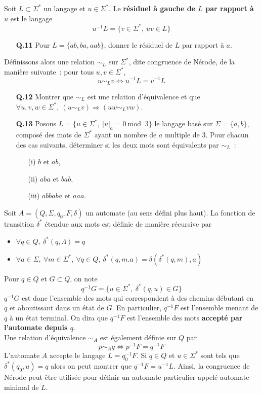 \documentclass[11pt,a4paper]{article}\nofiles
\begin{document}
Soit $L\subset \Sigma^*$ un langage et $u\in \Sigma^*$. Le \textbf{r\'esiduel \`a gauche de $L$ par rapport \`a $u$} est le langage
\[u^{-1}L=\{v\in \Sigma^*,\ uv\in L\}\]
\begin{enumerate}
\item[{\bf Q.11}] Pour $L=\{ab,ba,aab\}$, donner le r\'esiduel de $L$ par rapport \`a $a$.
\end{enumerate}
D\'efinissons alors une relation $\sim_L$ sur $\Sigma^*$, dite congruence de N\'erode, de la mani\`ere suivante~: pour tous $u,v\in \Sigma^*$,
\[u\sim_L v\iff u^{-1}L=v^{-1}L\]
\begin{enumerate}
\item[{\bf Q.12}] Montrer que $\sim_L$ est une relation d'\'equivalence et que $\forall u,v,w\in \Sigma^*,\ (u\sim_Lv)\Rightarrow (uw\sim_L vw)$.
\item[{\bf Q.13}] Posons $L=\{u\in \Sigma^*,\ |u|_a=0\ \textrm{mod }\ 3\}$ le langage bas\'e sur $\Sigma=\{a,b\}$, compos\'e des mots de $\Sigma^*$ ayant un nombre de $a$ multiple de $3$. Pour chacun des cas suivants, d\'eterminer si les deux mots sont \'equivalents par $\sim_L$~:
\begin{enumerate}
\item[(i)] $b$ et $ab$,
\item[(ii)] $aba$ et $bab$,
\item[(iii)] $abbaba$ et $aaa$.
\end{enumerate}
\end{enumerate}
Soit $A=(Q,\Sigma,q_0,F,\delta)$ un automate (au sens d\'efini plus haut). La fonction de transition $\delta^*$ \'etendue aux mots est d\'efinie de mani\`ere r\'ecursive par
\begin{itemize}
\item $\forall q\in Q,\ \delta^*(q,\Lambda)=q$
\item $\forall a\in \Sigma,\ \forall m\in \Sigma^*,\ \forall q\in Q,\ \delta^*(q,m.a)=\delta(\delta^*(q,m),a)$
\end{itemize}
Pour $q\in Q$ et $G\subset Q$, on note
\[q^{-1}G=\{u\in \Sigma^*,\ \delta^*(q,u)\in G\}\]
$q^{-1}G$ est donc l'ensemble des mots qui correspondent \`a des chemins d\'ebutant en $q$ et aboutissant dans un \'etat de $G$. En particulier, $q^{-1}F$ est l'ensemble menant de $q$ \`a un \'etat terminal. On dira que $q^{-1}F$ est l'ensemble des mots \textbf{accept\'e par l'automate depuis $q$}.\\

Une relation d'\'equivalence $\sim_A$ est \'egalement d\'efinie sur $Q$ par
\[p\sim_A q\iff p^{-1}F=q^{-1}F\]
L'automate $A$ accepte le langage $L=q_0^{-1}F$. Si $q\in Q$ et $u\in \Sigma^*$ sont tels que $\delta^*(q_0,u)=q$ alors on peut montrer que $q^{-1}F=u^{-1}L$. 
Ainsi, la congruence de N\'erode peut \^etre utilis\'ee pour d\'efinir un automate particulier appel\'e automate minimal de $L$.\\
\end{document}
